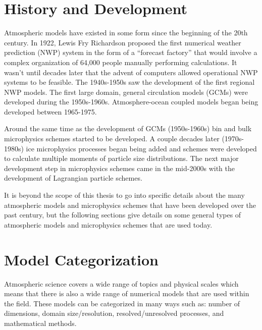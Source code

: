 \section{History and Development} \label{sec:modeling}
Atmospheric models have existed in some form since the beginning of the 20th century. In 1922, Lewis Fry Richardson proposed the first numerical weather prediction (NWP) system in the form of a ``forecast factory'' that would involve a complex organization of 64,000 people manually performing calculations. It wasn't until decades later that the advent of computers allowed operational NWP systems to be feasible. The 1940s-1950s saw the development of the first regional NWP models. The first large domain, general circulation models (GCMs) were developed during the 1950s-1960s. Atmosphere-ocean coupled models began being developed between 1965-1975. \citep{edwa2000}

Around the same time as the development of GCMs (1950s-1960s) bin and bulk microphysics schemes started to be developed. A couple decades later (1970s-1980s) ice microphysics processes began being added and schemes were developed to calculate multiple moments of particle size distributions. The next major development step in microphysics schemes came in the mid-2000s with the development of Lagrangian particle schemes. \citep{morr2020}

It is beyond the scope of this thesis to go into specific details about the many atmospheric models and microphysics schemes that have been developed over the past century, but the following sections give details on some general types of atmospheric models and microphysics schemes that are used today.

\section{Model Categorization} \label{sec:modelCats}
Atmospheric science covers a wide range of topics and physical scales which means that there is also a wide range of numerical models that are used within the field. These models can be categorized in many ways such as: number of dimensions, domain size/resolution, resolved/unresolved processes, and mathematical methods.


